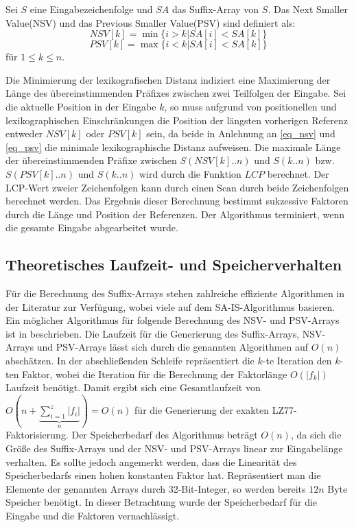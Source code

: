 Sei $S$ eine Eingabezeichenfolge und $SA$ das Suffix-Array von $S$. Das Next Smaller Value(NSV) und das Previous Smaller Value(PSV) sind definiert als:
\begin{equation} \label{eq_nsv}
    NSV[k] = \min\{i > k | SA[i] < SA[k]\}
\end{equation}
\begin{equation} \label{eq_psv}
    PSV[k] = \max\{i < k | SA[i] < SA[k]\}
\end{equation}
für $1\leq k \leq n$.

Die Minimierung der lexikografischen Distanz indiziert eine Maximierung der Länge des übereinstimmenden Präfixes zwischen zwei Teilfolgen der Eingabe.
Sei die aktuelle Position in der Eingabe $k$, so muss aufgrund von positionellen und lexikographischen Einschränkungen die 
Position der längsten vorherigen Referenz entweder $NSV[k]$ oder $PSV[k]$ sein, da beide in Anlehnung an \ref{eq_nsv} und \ref{eq_psv} die
minimale lexikographische Distanz aufweisen. Die maximale Länge der übereinstimmenden Präfixe zwischen $S(NSV[k]..n)$ und $S(k..n)$ bzw. $S(PSV[k]..n)$ 
und $S(k..n)$ wird durch die Funktion $LCP$ berechnet. Der LCP-Wert zweier Zeichenfolgen kann durch einen Scan durch beide
Zeichenfolgen berechnet werden. Das Ergebnis dieser Berechnung bestimmt sukzessive Faktoren durch die Länge und Position der Referenzen. Der Algorithmus 
terminiert, wenn die gesamte Eingabe abgearbeitet wurde.

\subsection{Theoretisches Laufzeit- und Speicherverhalten}
Für die Berechnung des Suffix-Arrays stehen zahlreiche effiziente Algorithmen in der Literatur zur Verfügung, wobei viele auf dem SA-IS-Algorithmus 
\cite{sais} basieren. Ein möglicher Algorithmus für folgende Berechnung des NSV- und PSV-Arrays ist in \cite{nsvpsv} beschrieben. Die Laufzeit für
die Generierung des Suffix-Arrays, NSV-Arrays und PSV-Arrays lässt sich durch die genannten Algorithmen auf $O(n)$ abschätzen. In der abschließenden 
Schleife repräsentiert die $k$-te Iteration den $k$-ten Faktor, wobei die Iteration für die Berechnung der Faktorlänge $O(|f_k|)$ Laufzeit benötigt. 
Damit ergibt sich eine Gesamtlaufzeit von $O(n +\underbrace{\sum_{i=1}^{z} |f_i|}_{n}) = O(n)$ für die Generierung der exakten LZ77-Faktorisierung.
Der Speicherbedarf des Algorithmus beträgt $O(n)$, da sich die Größe des Suffix-Arrays und der NSV- und PSV-Arrays linear zur Eingabelänge verhalten. Es sollte jedoch
angemerkt werden, dass die Linearität des Speicherbedarfs einen hohen konstanten Faktor hat. Repräsentiert man die Elemente der genannten Arrays durch 32-Bit-Integer,
so werden bereits $12n$ Byte Speicher benötigt. In dieser Betrachtung wurde der Speicherbedarf für die Eingabe und die Faktoren vernachlässigt.


